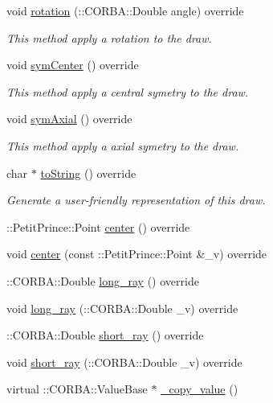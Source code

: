 \begin{DoxyCompactItemize}
void \hyperlink{class_ellipse_a58a77992e5d24f53f3011dfb8b08a8e7}{rotation} (\+::C\+O\+R\+B\+A\+::\+Double angle) override
\begin{DoxyCompactList}\small\item\em This method apply a rotation to the draw. \end{DoxyCompactList}\item 
void \hyperlink{class_ellipse_ac78274d703236f85efebd2db6767f640}{sym\+Center} () override
\begin{DoxyCompactList}\small\item\em This method apply a central symetry to the draw. \end{DoxyCompactList}\item 
void \hyperlink{class_ellipse_ad9956caa2504bbb07d4df9493f03d503}{sym\+Axial} () override
\begin{DoxyCompactList}\small\item\em This method apply a axial symetry to the draw. \end{DoxyCompactList}\item 
char $\ast$ \hyperlink{class_ellipse_ad04e67710b8eef3e89e95456ea602479}{to\+String} () override
\begin{DoxyCompactList}\small\item\em Generate a user-\/friendly representation of this draw. \end{DoxyCompactList}\item 
\+::Petit\+Prince\+::\+Point \hyperlink{class_ellipse_ad5e117e2df2c0103e89544e3a051f74d}{center} () override
\item 
void \hyperlink{class_ellipse_aaafe4d4981d9a51f798c8474f8ad42ee}{center} (const \+::Petit\+Prince\+::\+Point \&\+\_\+v) override
\item 
\+::C\+O\+R\+B\+A\+::\+Double \hyperlink{class_ellipse_a5776141608d4d5bbfaac0f2036bf111a}{long\+\_\+ray} () override
\item 
void \hyperlink{class_ellipse_a59dced7606ea1c3d657c7753edfae078}{long\+\_\+ray} (\+::C\+O\+R\+B\+A\+::\+Double \+\_\+v) override
\item 
\+::C\+O\+R\+B\+A\+::\+Double \hyperlink{class_ellipse_a955c0a05e02b4bb11df206f08c9c7650}{short\+\_\+ray} () override
\item 
void \hyperlink{class_ellipse_a626d2025a6e27ec4f52a4f419219a5cd}{short\+\_\+ray} (\+::C\+O\+R\+B\+A\+::\+Double \+\_\+v) override
\item 
virtual \+::C\+O\+R\+B\+A\+::\+Value\+Base $\ast$ \hyperlink{class_ellipse_a325a05f5f1c4141ec6c99e416564b476}{\+\_\+copy\+\_\+value} ()

\end{DoxyCompactItemize}
